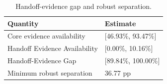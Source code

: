 \begin{table}[t]
\centering
\caption{Handoff-evidence gap and robust separation.}
\label{tab:handoff-gap}
\footnotesize
\begin{tabular}{@{}L{0.48\columnwidth}L{0.42\columnwidth}@{}}
\toprule
Quantity & Estimate \\
\midrule
Core evidence availability & [46.93\%, 93.47\%] \\
Handoff Evidence Availability & [0.00\%, 10.16\%] \\
Handoff-Evidence Gap & [89.84\%, 100.00\%] \\
Minimum robust separation & 36.77 pp \\
\bottomrule
\end{tabular}
\end{table}
